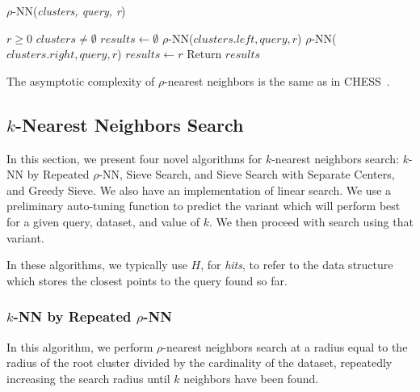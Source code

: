 \begin{algorithm} 
    \caption{$\rho$-NN(\emph{clusters, query, r})} 
    \label{alg:rnn} 
    \begin{algorithmic}[2]
        \REQUIRE $r \geq 0$
        \REQUIRE $clusters \neq \emptyset$
        \STATE $results \leftarrow \emptyset$
                \STATE $\rho$-NN($clusters.left, query, r$)
            \ENDIF
        \ENDIF
                \STATE $\rho$-NN($clusters.right, query, r$)
            \ENDIF
        \ENDIF
                    \STATE $results \leftarrow r$
                \ENDIF
            \ENDFOR
        \ENDIF
        \STATE Return $results$
    \end{algorithmic}
    \end{algorithm}

The asymptotic complexity of $\rho$-nearest neighbors is the same as in CHESS~\cite{ishaq2019clustered}.

\subsection{\texorpdfstring{$k$}{k}-Nearest Neighbors Search}
\label{subsec:methods:knn-search}

In this section, we present four novel algorithms for $k$-nearest neighbors search: $k$-NN by Repeated $\rho$-NN, Sieve Search, and Sieve Search with Separate Centers, 
and  Greedy Sieve. 
We also have an implementation of linear search. We use a preliminary auto-tuning function to predict the variant which will perform 
best for a given query, dataset, and value of $k$. We then proceed with search using that variant.  

In these algorithms, we typically use $H$, for \emph{hits}, to refer to the data structure which stores the closest points to the query found so far. 


\subsubsection{$k$-NN by Repeated $\rho$-NN}
\label{subsubsec:methods:knn-search:repeated-rnn}


In this algorithm, we perform $\rho$-nearest neighbors search at a radius equal to the radius of the root cluster divided by
the cardinality of the dataset, repeatedly increasing the search radius until $k$ neighbors
have been found.

